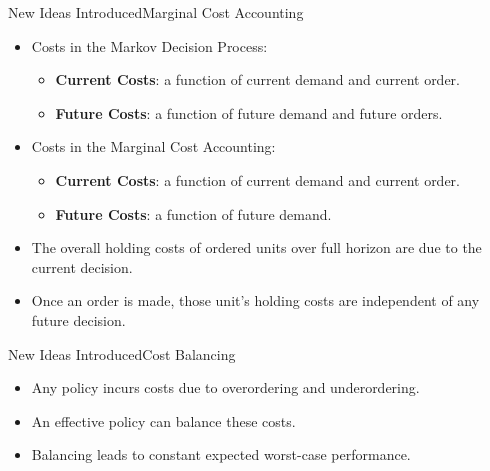 \documentclass{beamer}
\begin{document}
\begin{frame}{New Ideas Introduced}{Marginal Cost Accounting}
    \begin{itemize}
        \item Costs in the Markov Decision Process: 
            \begin{itemize}
                \item \textbf{Current Costs}: a function of current demand and current order.
                \item \textbf{Future Costs}: a function of future demand and future orders.
            \end{itemize}
        \item Costs in the Marginal Cost Accounting:
            \begin{itemize}
                \item \textbf{Current Costs}: a function of current demand and current order.
                \item \textbf{Future Costs}: a function of future demand.
            \end{itemize}
        \item The overall holding costs of ordered units over full horizon are due to the current decision.
        \item Once an order is made, those unit's holding costs are independent of any future decision.
    \end{itemize}
\end{frame}

\begin{frame}{New Ideas Introduced}{Cost Balancing}
    \begin{itemize}
        \item Any policy incurs costs due to overordering and underordering.
        \item An effective policy can balance these costs.
        \item Balancing leads to constant expected worst-case performance. 
    \end{itemize}
\end{frame}
\end{document}
